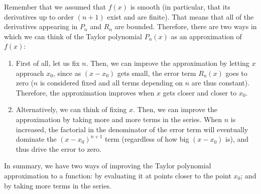 Remember that we assumed that $f(x)$ is smooth (in particular, that
its derivatives up to order $(n+1)$ exist and are finite).
That means that all of the derivatives appearing in $P_n$ and $R_n$
are bounded.
Therefore, there are two ways in which we can think of the Taylor
polynomial $P_n(x)$ as an 
approximation of $f(x)$:
\begin{enumerate}
\item First of all, let us fix $n$.  
  Then, we can improve the approximation by letting $x$ approach
  $x_0$, since as $(x-x_0)$ gets small, the error term $R_n(x)$ goes
  to zero ($n$ is considered fixed and all terms depending on $n$ are
  thus constant).  Therefore, the approximation improves when $x$ gets
  closer and closer to $x_0$.
\item Alternatively, we can think of fixing $x$.  Then, we can improve
  the approximation by taking more and more terms in the series.  When
  $n$ is increased, the factorial in the denominator of the error term
  will eventually dominate the $(x-x_0)^{n+1}$ term (regardless of how
  big $(x-x_0)$ is), and thus
  drive the error to zero.
\end{enumerate}
In summary, we have two ways of improving the Taylor polynomial
approximation to a function: by evaluating it at points closer to the
point $x_0$; and by taking more terms in the series.

